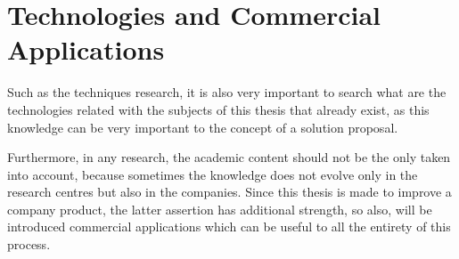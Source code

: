\section{Technologies and Commercial Applications}
\label{sec:technologies_and_commercial_applications}
Such as the techniques research, it is also very important to search what are 
the technologies related with the subjects of this thesis that already exist, 
as this knowledge can be very important to the concept of a solution proposal.

Furthermore, in any research, the academic content should not be the only taken into 
account, because sometimes the knowledge does not evolve only in the research 
centres but also in the companies. Since this thesis is made to improve a 
company product, the latter assertion has additional strength, so also, will be 
introduced commercial applications which can be useful to all the entirety of 
this process.
